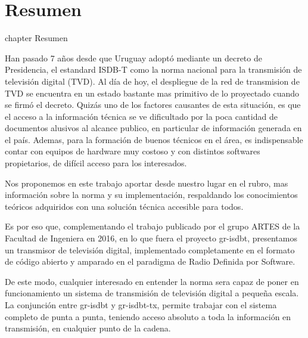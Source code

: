 \chapter*{Resumen}
 {chapter} {Resumen}%

Han pasado 7 años desde que Uruguay adoptó mediante un decreto de Presidencia, el estandard ISDB-T como la norma nacional para la transmisión de televisión digital (TVD). Al día de hoy, el despliegue de la red de transmision de TVD se encuentra en un estado bastante mas primitivo de lo proyectado cuando se firmó el decreto. Quizás uno de los factores causantes de esta situación, es que el acceso a la información técnica se ve dificultado por la poca cantidad de documentos alusivos al alcance publico, en particular de información generada en el país. Ademas, para la formación de buenos técnicos en el área, es indispensable contar con equipos de hardware muy costoso y con distintos softwares propietarios, de difícil acceso para los interesados.

Nos proponemos en este trabajo aportar desde nuestro lugar en el rubro, mas información sobre la norma y su implementación, respaldando los conocimientos teóricos adquiridos con una solución técnica accesible para todos. 

Es por eso que, complementando el trabajo publicado por el grupo ARTES de la Facultad de Ingeniera en 2016, en lo que fuera el proyecto gr-isdbt, presentamos un transmisor de televisión digital, implementado completamente en el formato de código abierto y amparado en el paradigma de Radio Definida por Software. 

De este modo, cualquier interesado en entender la norma sera capaz de poner en funcionamiento un sistema de transmisión de televisión digital a pequeña escala. La conjunción entre gr-isdbt y gr-isdbt-tx, permite trabajar con el sistema completo de punta a punta, teniendo acceso absoluto a toda la información en transmisión, en cualquier punto de la cadena.